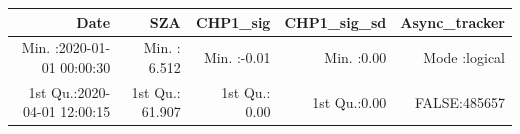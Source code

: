 \documentclass[
  10pt,
  a4paper,oneside]{article}
\begin{document}
\begin{longtable}[]{@{}rrrrr@{}}
\toprule
\begin{minipage}[b]{0.27\columnwidth}\raggedleft
Date\strut
\end{minipage} & \begin{minipage}[b]{0.16\columnwidth}\raggedleft
SZA\strut
\end{minipage} & \begin{minipage}[b]{0.14\columnwidth}\raggedleft
CHP1\_sig\strut
\end{minipage} & \begin{minipage}[b]{0.14\columnwidth}\raggedleft
CHP1\_sig\_sd\strut
\end{minipage} & \begin{minipage}[b]{0.14\columnwidth}\raggedleft
Async\_tracker\strut
\end{minipage}\tabularnewline
\midrule
\endhead
\begin{minipage}[t]{0.27\columnwidth}\raggedleft
Min. :2020-01-01 00:00:30\strut
\end{minipage} & \begin{minipage}[t]{0.16\columnwidth}\raggedleft
Min. : 6.512\strut
\end{minipage} & \begin{minipage}[t]{0.14\columnwidth}\raggedleft
Min. :-0.01\strut
\end{minipage} & \begin{minipage}[t]{0.14\columnwidth}\raggedleft
Min. :0.00\strut
\end{minipage} & \begin{minipage}[t]{0.14\columnwidth}\raggedleft
Mode :logical\strut
\end{minipage}\tabularnewline
\begin{minipage}[t]{0.27\columnwidth}\raggedleft
1st Qu.:2020-04-01 12:00:15\strut
\end{minipage} & \begin{minipage}[t]{0.16\columnwidth}\raggedleft
1st Qu.: 61.907\strut
\end{minipage} & \begin{minipage}[t]{0.14\columnwidth}\raggedleft
1st Qu.: 0.00\strut
\end{minipage} & \begin{minipage}[t]{0.14\columnwidth}\raggedleft
1st Qu.:0.00\strut
\end{minipage} & \begin{minipage}[t]{0.14\columnwidth}\raggedleft
FALSE:485657\strut
\end{minipage}\tabularnewline

\end{longtable}
\end{document}
